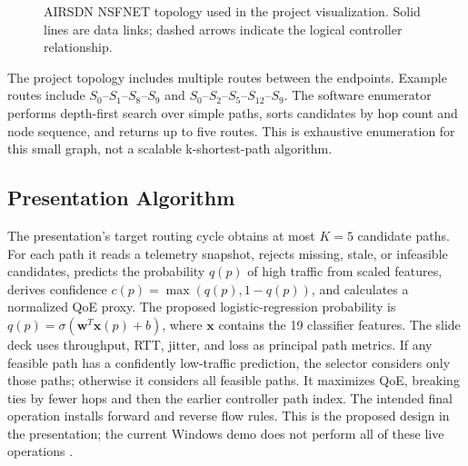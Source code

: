 \documentclass[conference]{IEEEtran}
\begin{document}
\begin{figure}[t]
\centering
{}
\caption{AIRSDN NSFNET topology used in the project visualization. Solid lines are data links; dashed arrows indicate the logical controller relationship.}
\label{fig:topology}
\end{figure}

The project topology includes multiple routes between the endpoints. Example routes include $S_0$--$S_1$--$S_8$--$S_9$ and $S_0$--$S_2$--$S_5$--$S_{12}$--$S_9$. The software enumerator performs depth-first search over simple paths, sorts candidates by hop count and node sequence, and returns up to five routes. This is exhaustive enumeration for this small graph, not a scalable k-shortest-path algorithm.

\subsection{Presentation Algorithm}
The presentation's target routing cycle obtains at most $K=5$ candidate paths. For each path it reads a telemetry snapshot, rejects missing, stale, or infeasible candidates, predicts the probability $q(p)$ of high traffic from scaled features, derives confidence $c(p)=\max(q(p),1-q(p))$, and calculates a normalized QoE proxy. The proposed logistic-regression probability is $q(p)=\sigma(\mathbf{w}^{T}\mathbf{x}(p)+b)$, where $\mathbf{x}$ contains the 19 classifier features. The slide deck uses throughput, RTT, jitter, and loss as principal path metrics. If any feasible path has a confidently low-traffic prediction, the selector considers only those paths; otherwise it considers all feasible paths. It maximizes QoE, breaking ties by fewer hops and then the earlier controller path index. The intended final operation installs forward and reverse flow rules. This is the proposed design in the presentation; the current Windows demo does not perform all of these live operations \cite{airsdn_presentation}.
\end{document}
